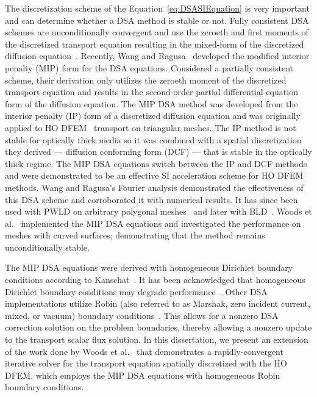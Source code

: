 \documentclass[12pt,letterpaper]{article}
\begin{document}
The discretization scheme of the Equation~\ref{eq:DSASIEquation} is very important and can determine whether a DSA method is stable or not. Fully consistent DSA schemes are unconditionally convergent and use the zeroeth and first moments of the discretized transport equation resulting in the mixed-form of the discretized diffusion equation~\cite{WarsaFullyConsistentLDDSA}. Recently, Wang and Ragusa~\cite{WangRagusaDSA} developed the modified interior penalty (MIP) form for the DSA equations. Considered a partially consistent scheme, their derivation only utilizes the zeroeth moment of the discretized transport equation and results in the second-order partial differential equation form of the diffusion equation. The MIP DSA method was developed from the interior penalty (IP) form of a discretized diffusion equation and was originally applied to HO DFEM \SN\ transport on triangular meshes. The IP method is not stable for optically thick media so it was combined with a spatial discretization they derived --- diffusion conforming form (DCF) --- that is stable in the optically thick regime. The MIP DSA equations switch between the IP and DCF methods and were demonstrated to be an effective SI acceleration scheme for HO DFEM methods. Wang and Ragusa's Fourier analysis demonstrated the effectiveness of this DSA scheme and corroborated it with numerical results. It has since been used with PWLD on arbitrary polygonal meshes~\cite{TurcksinDiscontinuousDSA} and later with BLD~\cite{TurcksinDSABLD}. Woods et al.~\cite{WoodsDSA} implemented the MIP DSA equations and investigated the performance on meshes with curved surfaces; demonstrating that the method remains unconditionally stable.

The MIP DSA equations were derived with homogeneous Dirichlet boundary conditions according to Kanschat~\cite{KanschatDGViscousIncompressFlow}. It has been acknowledged that homogeneous Dirichlet boundary conditions may degrade performance~\cite{WangDissertation}. Other DSA implementations utilize Robin (also referred to as Marshak, zero incident current, mixed, or vacuum) boundary conditions~\cite{WarsaFullyConsistentLDDSA,AdamsDSADFEM}. This allows for a nonzero DSA correction solution on the problem boundaries, thereby allowing a nonzero update to the transport scalar flux solution. In this dissertation, we present an extension of the work done by Woods et al.~\cite{WoodsDSA} that demonstrates a rapidly-convergent iterative solver for the transport equation spatially discretized with the HO DFEM, which employs the MIP DSA equations with homogeneous Robin boundary conditions.
\end{document}
